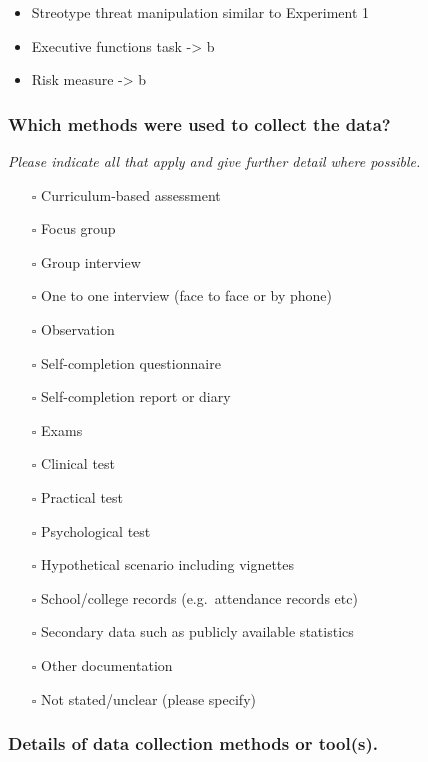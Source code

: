 \documentclass[
  doc, a4paper]{apa7}
\providecommand{\tightlist}{%
  \setlength{\itemsep}{0pt}\setlength{\parskip}{0pt}}
\begin{document}
\begin{itemize}
\tightlist
\item
  Streotype threat manipulation similar to Experiment 1
\item
  Executive functions task -\textgreater{} b
\item
  Risk measure -\textgreater{} b
\end{itemize}

\subsubsection{Which methods were used to collect the data?}\label{which-methods-were-used-to-collect-the-data}

\emph{Please indicate all that apply and give further detail where possible.}

\begin{itemize}
\tightlist
\item[$\square$]
  Curriculum-based assessment
\item[$\square$]
  Focus group
\item[$\square$]
  Group interview
\item[$\square$]
  One to one interview (face to face or by phone)
\item[$\square$]
  Observation
\item[$\square$]
  Self-completion questionnaire
\item[$\square$]
  Self-completion report or diary
\item[$\square$]
  Exams
\item[$\square$]
  Clinical test
\item[$\square$]
  Practical test
\item[$\square$]
  Psychological test
\item[$\square$]
  Hypothetical scenario including vignettes
\item[$\square$]
  School/college records (e.g.~attendance records etc)
\item[$\square$]
  Secondary data such as publicly available statistics
\item[$\square$]
  Other documentation
\item[$\square$]
  Not stated/unclear (please specify)
\end{itemize}

\subsubsection{Details of data collection methods or tool(s).}\label{details-of-data-collection-methods-or-tools.}
\end{document}
